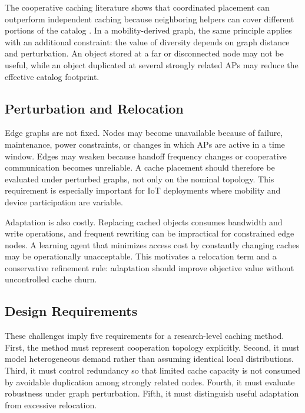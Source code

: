 The cooperative caching literature shows that coordinated placement can outperform independent caching because neighboring helpers can cover different portions of the catalog \cite{Shanmugam2013,Golrezaei2014JSAC,MaddahAli2014}. In a mobility-derived graph, the same principle applies with an additional constraint: the value of diversity depends on graph distance and perturbation. An object stored at a far or disconnected node may not be useful, while an object duplicated at several strongly related APs may reduce the effective catalog footprint.

\subsection{Perturbation and Relocation}

Edge graphs are not fixed. Nodes may become unavailable because of failure, maintenance, power constraints, or changes in which APs are active in a time window. Edges may weaken because handoff frequency changes or cooperative communication becomes unreliable. A cache placement should therefore be evaluated under perturbed graphs, not only on the nominal topology. This requirement is especially important for IoT deployments where mobility and device participation are variable.

Adaptation is also costly. Replacing cached objects consumes bandwidth and write operations, and frequent rewriting can be impractical for constrained edge nodes. A learning agent that minimizes access cost by constantly changing caches may be operationally unacceptable. This motivates a relocation term and a conservative refinement rule: adaptation should improve objective value without uncontrolled cache churn.

\subsection{Design Requirements}

These challenges imply five requirements for a research-level caching method. First, the method must represent cooperation topology explicitly. Second, it must model heterogeneous demand rather than assuming identical local distributions. Third, it must control redundancy so that limited cache capacity is not consumed by avoidable duplication among strongly related nodes. Fourth, it must evaluate robustness under graph perturbation. Fifth, it must distinguish useful adaptation from excessive relocation.

